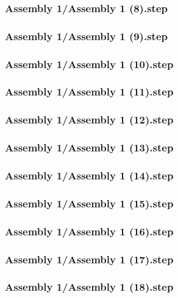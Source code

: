 \documentclass[a4paper,12pt]{article}
\begin{document}
\subsubsection{Assembly 1/Assembly 1 (8).step}

\subsubsection{Assembly 1/Assembly 1 (9).step}

\subsubsection{Assembly 1/Assembly 1 (10).step}

\subsubsection{Assembly 1/Assembly 1 (11).step}

\subsubsection{Assembly 1/Assembly 1 (12).step}

\subsubsection{Assembly 1/Assembly 1 (13).step}

\subsubsection{Assembly 1/Assembly 1 (14).step}

\subsubsection{Assembly 1/Assembly 1 (15).step}

\subsubsection{Assembly 1/Assembly 1 (16).step}

\subsubsection{Assembly 1/Assembly 1 (17).step}

\subsubsection{Assembly 1/Assembly 1 (18).step}

\end{document}
